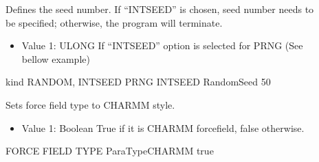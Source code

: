 \documentclass[letterpaper,10pt,english]{sphinxmanual}
\begin{document}
\begin{description}
\item[{}] \leavevmode
\sphinxAtStartPar
Defines the seed number. If “INTSEED” is chosen, seed number needs to be specified; otherwise, the program will terminate.
\begin{itemize}
\item {} 
\sphinxAtStartPar
Value 1: ULONG \sphinxhyphen{} If “INTSEED” option is selected for PRNG (See bellow example)

\end{itemize}

\begin{sphinxVerbatim}[commandchars=\\\{\}]
\PYGZsh{}\PYGZsh{}\PYGZsh{}\PYGZsh{}\PYGZsh{}\PYGZsh{}\PYGZsh{}\PYGZsh{}\PYGZsh{}\PYGZsh{}\PYGZsh{}\PYGZsh{}\PYGZsh{}\PYGZsh{}\PYGZsh{}\PYGZsh{}\PYGZsh{}\PYGZsh{}\PYGZsh{}\PYGZsh{}\PYGZsh{}\PYGZsh{}\PYGZsh{}\PYGZsh{}\PYGZsh{}\PYGZsh{}\PYGZsh{}\PYGZsh{}\PYGZsh{}\PYGZsh{}\PYGZsh{}\PYGZsh{}\PYGZsh{}
\PYGZsh{} kind \PYGZob{}RANDOM, INTSEED\PYGZcb{}
\PYGZsh{}\PYGZsh{}\PYGZsh{}\PYGZsh{}\PYGZsh{}\PYGZsh{}\PYGZsh{}\PYGZsh{}\PYGZsh{}\PYGZsh{}\PYGZsh{}\PYGZsh{}\PYGZsh{}\PYGZsh{}\PYGZsh{}\PYGZsh{}\PYGZsh{}\PYGZsh{}\PYGZsh{}\PYGZsh{}\PYGZsh{}\PYGZsh{}\PYGZsh{}\PYGZsh{}\PYGZsh{}\PYGZsh{}\PYGZsh{}\PYGZsh{}\PYGZsh{}\PYGZsh{}\PYGZsh{}\PYGZsh{}\PYGZsh{}
PRNG          INTSEED
Random\PYGZus{}Seed    50
\end{sphinxVerbatim}

\item[{}] \leavevmode
\sphinxAtStartPar
Sets force field type to CHARMM style.
\begin{itemize}
\item {} 
\sphinxAtStartPar
Value 1: Boolean \sphinxhyphen{} True if it is CHARMM forcefield, false otherwise.

\end{itemize}

\begin{sphinxVerbatim}[commandchars=\\\{\}]
\PYGZsh{}\PYGZsh{}\PYGZsh{}\PYGZsh{}\PYGZsh{}\PYGZsh{}\PYGZsh{}\PYGZsh{}\PYGZsh{}\PYGZsh{}\PYGZsh{}\PYGZsh{}\PYGZsh{}\PYGZsh{}\PYGZsh{}\PYGZsh{}\PYGZsh{}\PYGZsh{}\PYGZsh{}\PYGZsh{}\PYGZsh{}\PYGZsh{}\PYGZsh{}\PYGZsh{}\PYGZsh{}\PYGZsh{}\PYGZsh{}\PYGZsh{}\PYGZsh{}\PYGZsh{}\PYGZsh{}\PYGZsh{}\PYGZsh{}
\PYGZsh{} FORCE FIELD TYPE
\PYGZsh{}\PYGZsh{}\PYGZsh{}\PYGZsh{}\PYGZsh{}\PYGZsh{}\PYGZsh{}\PYGZsh{}\PYGZsh{}\PYGZsh{}\PYGZsh{}\PYGZsh{}\PYGZsh{}\PYGZsh{}\PYGZsh{}\PYGZsh{}\PYGZsh{}\PYGZsh{}\PYGZsh{}\PYGZsh{}\PYGZsh{}\PYGZsh{}\PYGZsh{}\PYGZsh{}\PYGZsh{}\PYGZsh{}\PYGZsh{}\PYGZsh{}\PYGZsh{}\PYGZsh{}\PYGZsh{}\PYGZsh{}\PYGZsh{}
ParaTypeCHARMM    true
\end{sphinxVerbatim}


\end{description}
\end{document}

